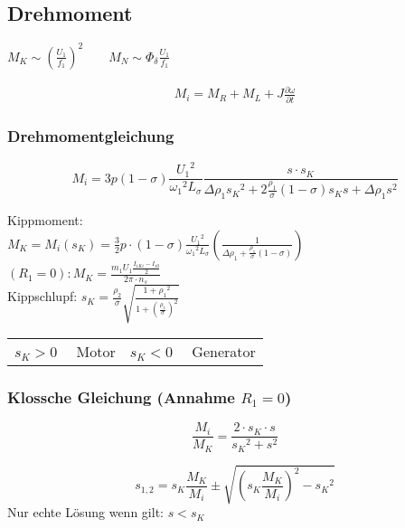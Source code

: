 \begin{sectionbox}
\subsection{Drehmoment}
\begin{emphbox}
$M_K\sim \left(\frac{U_1}{f_1}\right)^2\qquad M_N\sim\Phi_\delta\frac{U_1}{f_1}$
\end{emphbox}
\begin{align*}
M_i = M_R + M_L + J\frac{\partial\omega}{\partial t}
\end{align*}
\subsubsection{Drehmomentgleichung}
\begin{emphbox}
\[M_i = 3p(1-\sigma)\frac{{U_1}^2}{{\omega_1}^2 L_\sigma}\frac{s \cdot s_K}{\Delta\rho_1{s_K}^2 + 2\frac{\rho_1}{\sigma}(1-\sigma)s_K s+\Delta\rho_1 s^2}\]
\end{emphbox}
Kippmoment:\\
$M_K = M_i(s_K) = \frac{3}{2} p\cdot (1-\sigma)\frac{{U_1}^2}{{\omega_1}^2 L_\sigma}\left( \frac{1}{\Delta\rho_1+\frac{\rho_1}{\sigma}(1-\sigma)}\right)$\\
$(R_1 = 0): M_K = \frac{m_1U_1\frac{I_{1Ki} - I_{10}}{2}}{2\pi\cdot n_s}$\\
Kippschlupf: $s_K = \frac{\rho_2}{\sigma}\sqrt{\frac{1+{\rho_1}^2}{1+\left(\frac{\rho_1}{\sigma}\right)^2}}$

\begin{symbolbox}
\begin{tabularx}{\columnwidth}{CC}
$s_K > 0\quad$ Motor & $s_K < 0\quad$ Generator
\end{tabularx}
\end{symbolbox}
\end{sectionbox}

\begin{sectionbox}
\subsubsection{Klossche Gleichung (Annahme $R_1 = 0$)}
\begin{emphbox}
\[\frac{M_i}{M_K} = \frac{2\cdot s_K\cdot s}{{s_K}^2 + s^2}\]
\end{emphbox}
\[s_{1,2} = s_K \frac{M_K}{M_i} \pm \sqrt{\left(s_K \frac{M_K}{M_i}\right)^2 - {s_K}^2}\]
Nur echte Lösung wenn gilt: \quad $s < s_K$
\end{sectionbox}

